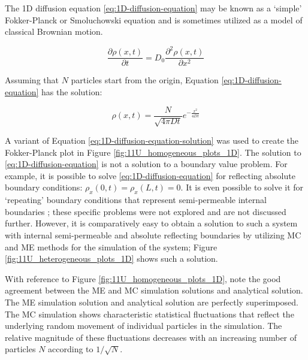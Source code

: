 	\nointerlineskip The 1D diffusion equation \ref{eq:1D-diffusion-equation} may be known as a `simple' Fokker-Planck or Smoluchowski equation and is sometimes utilized as a model of classical Brownian motion.
	
	\begin{equation}
	\label{eq:1D-diffusion-equation}
		\frac{\partial\rho(x,t)}{\partial t} = D_0 \frac{\partial^2 \rho(x,t)}{\partial x^2}
	\end{equation}
	
	\noindent Assuming that $ N $ particles start from the origin, Equation \ref{eq:1D-diffusion-equation} has the solution:
	
	\begin{equation}
	\label{eq:1D-diffusion-equation-solution}
		\rho(x,t)=\frac{N}{\sqrt{4\pi Dt}}e^{-\frac{x^2}{4Dt}}
	\end{equation}	
	
	A variant of Equation \ref{eq:1D-diffusion-equation-solution} was used to create the Fokker-Planck plot in Figure \ref{fig:11U_homogeneous_plots_1D}. The solution to \ref{eq:1D-diffusion-equation} is not a solution to a boundary value problem. For example, it is possible to solve \ref{eq:1D-diffusion-equation} for reflecting absolute boundary conditions: $ \rho_x(0,t) = \rho_x(L,t) = 0 $. It is even possible to solve it for `repeating' boundary conditions that represent semi-permeable internal boundaries \citep{cervi}; these specific problems were not explored and are not discussed further. However, it is comparatively easy to obtain a solution to such a system with internal semi-permeable and absolute reflecting boundaries by utilizing MC and ME methods for the simulation of the system; Figure \ref{fig:11U_heterogeneous_plots_1D} shows such a solution.
	
	With reference to Figure \ref{fig:11U_homogeneous_plots_1D}, note the good agreement between the ME and MC simulation solutions and analytical solution. The ME simulation solution and analytical solution are perfectly superimposed. The MC simulation shows characteristic statistical fluctuations that reflect the underlying random movement of individual particles in the simulation. The relative magnitude of these fluctuations decreases with an increasing number of particles $ N $ according to $ 1/\sqrt{N} $.

